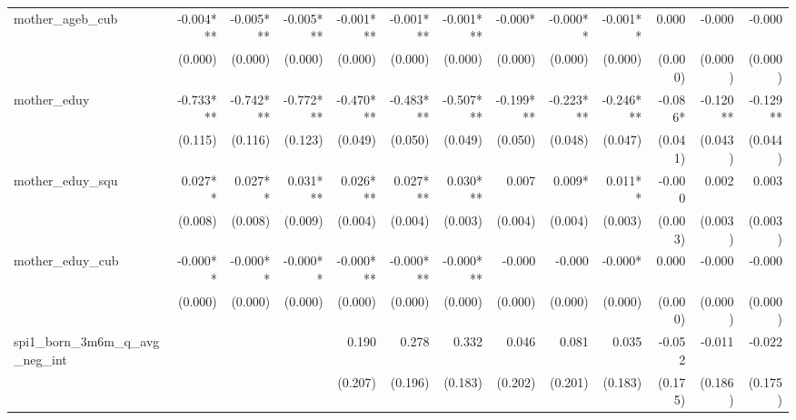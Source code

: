 \begin{tabular}{lrrrrrrrrrrrr}
mother\_ageb\_cub                           &    -0.004*** &    -0.005*** &    -0.005*** &    -0.001*** &    -0.001*** &    -0.001*** &      -0.000* &     -0.000** &     -0.001** &        0.000 &       -0.000 &       -0.000 \\ 
                                            &      (0.000) &      (0.000) &      (0.000) &      (0.000) &      (0.000) &      (0.000) &      (0.000) &      (0.000) &      (0.000) &      (0.000) &      (0.000) &      (0.000) \\ 
mother\_eduy                                &    -0.733*** &    -0.742*** &    -0.772*** &    -0.470*** &    -0.483*** &    -0.507*** &    -0.199*** &    -0.223*** &    -0.246*** &      -0.086* &     -0.120** &     -0.129** \\ 
                                            &      (0.115) &      (0.116) &      (0.123) &      (0.049) &      (0.050) &      (0.049) &      (0.050) &      (0.048) &      (0.047) &      (0.041) &      (0.043) &      (0.044) \\ 
mother\_eduy\_squ                           &      0.027** &      0.027** &     0.031*** &     0.026*** &     0.027*** &     0.030*** &        0.007 &       0.009* &      0.011** &       -0.000 &        0.002 &        0.003 \\ 
                                            &      (0.008) &      (0.008) &      (0.009) &      (0.004) &      (0.004) &      (0.003) &      (0.004) &      (0.004) &      (0.003) &      (0.003) &      (0.003) &      (0.003) \\ 
mother\_eduy\_cub                           &     -0.000** &     -0.000** &     -0.000** &    -0.000*** &    -0.000*** &    -0.000*** &       -0.000 &       -0.000 &      -0.000* &        0.000 &       -0.000 &       -0.000 \\ 
                                            &      (0.000) &      (0.000) &      (0.000) &      (0.000) &      (0.000) &      (0.000) &      (0.000) &      (0.000) &      (0.000) &      (0.000) &      (0.000) &      (0.000) \\ 
spi1\_born\_3m6m\_q\_avg\_neg\_int          &              &              &              &        0.190 &        0.278 &        0.332 &        0.046 &        0.081 &        0.035 &       -0.052 &       -0.011 &       -0.022 \\ 
                                            &              &              &              &      (0.207) &      (0.196) &      (0.183) &      (0.202) &      (0.201) &      (0.183) &      (0.175) &      (0.186) &      (0.175) \\ 

\end{tabular}
